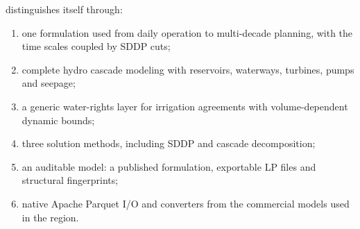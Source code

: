 \gtopt{} distinguishes itself through:
\begin{enumerate}
  \item one formulation used from daily operation to multi-decade
    planning, with the time scales coupled by SDDP cuts;
  \item complete hydro cascade modeling with reservoirs, waterways,
    turbines, pumps and seepage;
  \item a generic water-rights layer for irrigation agreements with
    volume-dependent dynamic bounds;
  \item three solution methods, including SDDP and cascade
    decomposition;
  \item an auditable model: a published formulation, exportable LP
    files and structural fingerprints;
  \item native Apache Parquet I/O and converters from the commercial
    models used in the region.
\end{enumerate}
